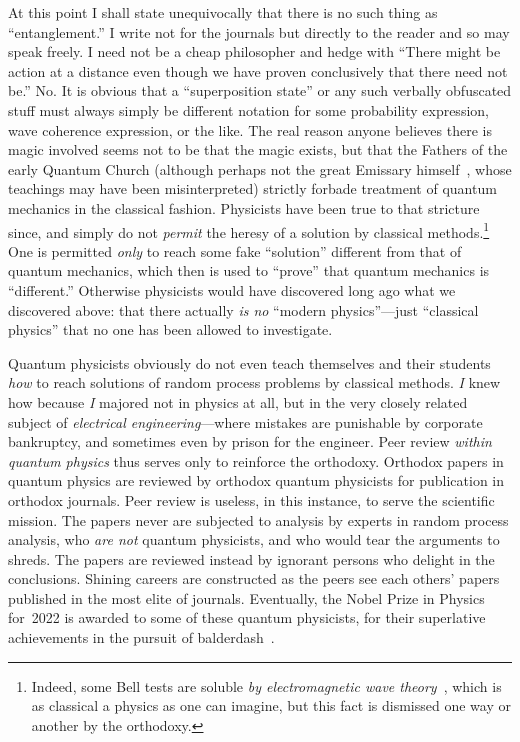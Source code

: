 \documentclass[9pt,technote]{IEEEtran}
\begin{document}
At this point I shall state unequivocally that there is no such thing
as ``entanglement.'' I write not for the journals but directly to the
reader and so may speak freely. I need not be a cheap philosopher and
hedge with ``There might be action at a distance even though we have
proven conclusively that there need not be.'' No. It is obvious that a
``superposition state'' or any such verbally obfuscated stuff must
always simply be different notation for some probability expression,
wave coherence expression, or the like. The real reason anyone
believes there is magic involved seems not to be that the magic
exists, but that the Fathers of the early Quantum Church (although
perhaps not the great Emissary himself~\cite{enwiki:1174555777}, whose
teachings may have been misinterpreted) strictly forbade treatment of
quantum mechanics in the classical fashion. Physicists have been true
to that stricture since, and simply do not {\em{permit}} the heresy of
a solution by classical methods.\footnote{Indeed, some Bell tests are
  soluble {\em{by electromagnetic wave
      theory}}~\cite{kracklauer:nonloc-or-geom}, which is as classical
  a physics as one can imagine, but this fact is dismissed one way or
  another by the orthodoxy.} One is permitted {\em{only}} to reach
some fake ``solution'' different from that of quantum mechanics, which
then is used to ``prove'' that quantum mechanics is ``different.''
Otherwise physicists would have discovered long ago what we discovered
above: that there actually {\em{is no}} ``modern physics''---just
``classical physics'' that no one has been allowed to investigate.

Quantum physicists obviously do not even teach themselves and their
students {\em{how}} to reach solutions of random process problems by
classical methods. {\em{I}} knew how because {\em{I}} majored not in
physics at all, but in the very closely related subject of
{\em{electrical engineering}}---where mistakes are punishable by
corporate bankruptcy, and sometimes even by prison for the
engineer. Peer review {\em{within quantum physics}} thus serves only
to reinforce the orthodoxy. Orthodox papers in quantum physics are
reviewed by orthodox quantum physicists for publication in orthodox
journals. Peer review is useless, in this instance, to serve the
scientific mission. The papers never are subjected to analysis by
experts in random process analysis, who {\em{are not}} quantum
physicists, and who would tear the arguments to shreds. The papers are
reviewed instead by ignorant persons who delight in the
conclusions. Shining careers are constructed as the peers see each
others’ papers published in the most elite of journals. Eventually,
the Nobel Prize in Physics for~2022 is awarded to some of these
quantum physicists, for their superlative achievements in the pursuit
of balderdash~\cite{enwiki:1169021780}.
\end{document}
